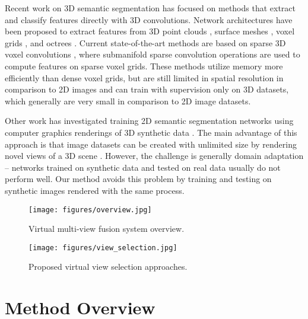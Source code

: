 \documentclass[runningheads]{llncs}
\begin{document}
\vspace*{2mm} Recent work on 3D semantic segmentation  has focused on methods that extract and classify features directly with 3D convolutions.  Network architectures have been proposed to extract features from 3D point clouds \cite{pham2019jsis3d,qi2017pointnet,qi2017pointnet++,shi2019pv,thomas2019kpconv,jsenet}, surface meshes \cite{hanocka2019meshcnn,huang2019texturenet}, voxel grids \cite{song2017semantic}, and octrees \cite{riegler2017octnet}.  Current state-of-the-art methods are based on sparse 3D voxel convolutions \cite{choy20194d,choy2019fully,graham20183d}, where submanifold sparse convolution operations are used to compute features on sparse voxel grids.   These methods utilize memory more efficiently than dense voxel grids, but are still limited in spatial resolution in comparison to 2D images and can train with supervision only on 3D datasets, which generally are very small in comparison to 2D image datasets.

\vspace*{2mm}  Other work has investigated training 2D semantic segmentation networks using computer graphics renderings of 3D synthetic data \cite{zhang2017physically}.   The main advantage of this approach is that image datasets can be created with unlimited size by rendering novel views of a 3D scene \cite{li2018interiornet,mccormac2017scenenet}.   However, the challenge is generally domain adaptation -- networks trained on synthetic data and tested on real data usually do not perform well.  Our method avoids this problem by training and testing on synthetic images rendered with the same process.



 \begin{figure}
    \centering
    \texttt{[image: figures/overview.jpg]}
    \caption{Virtual multi-view fusion system overview.}
    \label{fig:overview}
\end{figure}

\begin{figure}[t]
    \centering
    \texttt{[image: figures/view\_selection.jpg]}
    \caption{Proposed virtual view selection approaches.}
    \label{fig:view_selection}
\end{figure}
\vspace{-5mm}

\section{Method Overview} \label{sec:methods}
\end{document}
